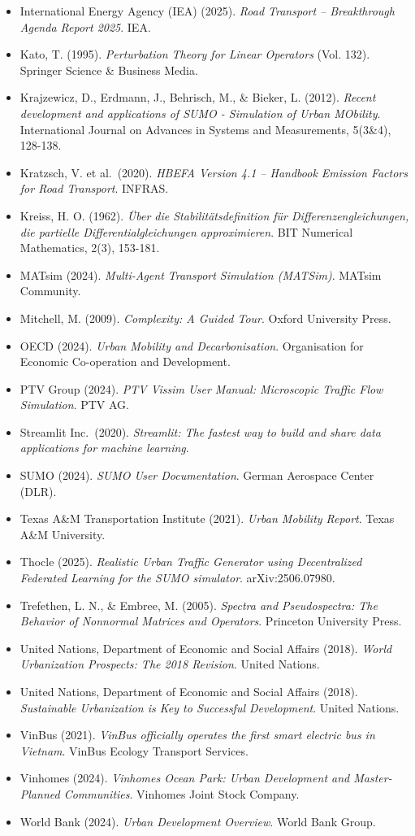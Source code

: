 \documentclass[10pt, a4paper]{article}
\begin{document}
\begin{itemize}
\item
  International Energy Agency (IEA) (2025). \emph{Road Transport --
  Breakthrough Agenda Report 2025}. IEA.
\item
  Kato, T. (1995). \emph{Perturbation Theory for Linear Operators} (Vol.
  132). Springer Science \& Business Media.
\item
  Krajzewicz, D., Erdmann, J., Behrisch, M., \& Bieker, L. (2012).
  \emph{Recent development and applications of SUMO - Simulation of
  Urban MObility}. International Journal on Advances in Systems and
  Measurements, 5(3\&4), 128-138.
\item
  Kratzsch, V. et al.~(2020). \emph{HBEFA Version 4.1 -- Handbook
  Emission Factors for Road Transport}. INFRAS.
\item
  Kreiss, H. O. (1962). \emph{Über die Stabilitätsdefinition für
  Differenzengleichungen, die partielle Differentialgleichungen
  approximieren}. BIT Numerical Mathematics, 2(3), 153-181.
\item
  MATsim (2024). \emph{Multi-Agent Transport Simulation (MATSim)}.
  MATsim Community.
\item
  Mitchell, M. (2009). \emph{Complexity: A Guided Tour}. Oxford
  University Press.
\item
  OECD (2024). \emph{Urban Mobility and Decarbonisation}. Organisation
  for Economic Co-operation and Development.
\item
  PTV Group (2024). \emph{PTV Vissim User Manual: Microscopic Traffic
  Flow Simulation}. PTV AG.
\item
  Streamlit Inc.~(2020). \emph{Streamlit: The fastest way to build and
  share data applications for machine learning}.
\item
  SUMO (2024). \emph{SUMO User Documentation}. German Aerospace Center
  (DLR).
\item
  Texas A\&M Transportation Institute (2021). \emph{Urban Mobility
  Report}. Texas A\&M University.
\item
  Thocle (2025). \emph{Realistic Urban Traffic Generator using
  Decentralized Federated Learning for the SUMO simulator}.
  arXiv:2506.07980.
\item
  Trefethen, L. N., \& Embree, M. (2005). \emph{Spectra and
  Pseudospectra: The Behavior of Nonnormal Matrices and Operators}.
  Princeton University Press.
\item
  United Nations, Department of Economic and Social Affairs (2018).
  \emph{World Urbanization Prospects: The 2018 Revision}. United
  Nations.
\item
  United Nations, Department of Economic and Social Affairs (2018).
  \emph{Sustainable Urbanization is Key to Successful Development}.
  United Nations.
\item
  VinBus (2021). \emph{VinBus officially operates the first smart
  electric bus in Vietnam}. VinBus Ecology Transport Services.
\item
  Vinhomes (2024). \emph{Vinhomes Ocean Park: Urban Development and
  Master-Planned Communities}. Vinhomes Joint Stock Company.
\item
  World Bank (2024). \emph{Urban Development Overview}. World Bank
  Group.
\end{itemize}
\end{document}

